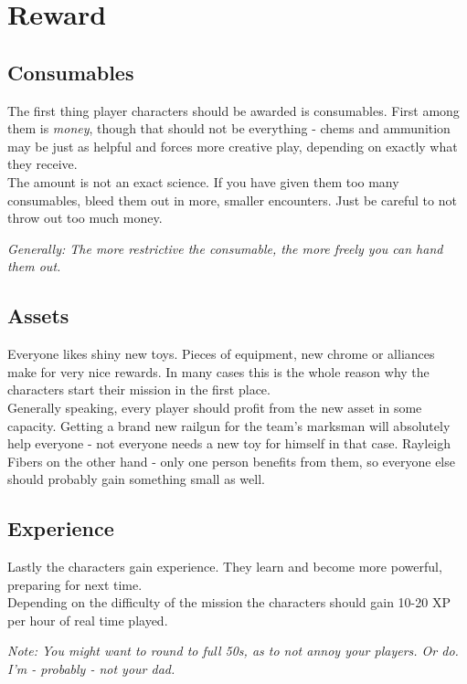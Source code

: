 \section{Reward}
\subsection{Consumables}
The first thing player characters should be awarded is consumables. First among them is \emph{money}, though that should not be everything - chems and ammunition may be just as helpful and forces more creative play, depending on exactly what they receive.\\
The amount is not an exact science. If you have given them too many consumables, bleed them out in more, smaller encounters. Just be careful to not throw out too much money.
\begin{exampleblock}
\textit{Generally: The more restrictive the consumable, the more freely you can hand them out.}
\end{exampleblock}
\subsection{Assets}
Everyone likes shiny new toys. Pieces of equipment, new chrome or alliances make for very nice rewards. In many cases this is the whole reason why the characters start their mission in the first place.\\
Generally speaking, every player should profit from the new asset in some capacity. Getting a brand new railgun for the team's marksman will absolutely help everyone - not everyone needs a new toy for himself in that case. Rayleigh Fibers on the other hand - only one person benefits from them, so everyone else should probably gain something small as well.
\subsection{Experience}
Lastly the characters gain experience. They learn and become more powerful, preparing for next time.\\
Depending on the difficulty of the mission the characters should gain 10-20 XP per hour of real time played.\\
\begin{exampleblock}
\textit{Note: You might want to round to full 50s, as to not annoy your players. Or do. I'm - probably - not your dad.}
\end{exampleblock}
